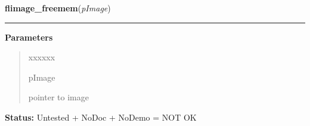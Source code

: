 \hspace{.8\funcindent}\begin{boxedminipage}{\funcwidth}

    \raggedright \textbf{flimage\_freemem}(\textit{pImage})

    \vspace{-1.5ex}

    \rule{\textwidth}{0.5\fboxrule}
\setlength{\parskip}{2ex}
\setlength{\parskip}{1ex}
      \textbf{Parameters}
      \vspace{-1ex}

      \begin{quote}
        \begin{Ventry}{xxxxxx}

          \item[pImage]

          pointer to image

        \end{Ventry}

      \end{quote}

\textbf{Status:} Untested + NoDoc + NoDemo = NOT OK



    \end{boxedminipage}

    \label{xformslib:library:flimage_get_closest_color_from_map}

    \vspace{0.5ex}

